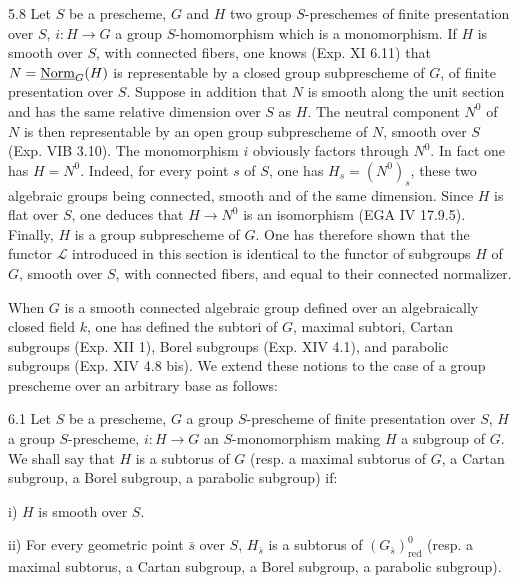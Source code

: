 \begin{remark}{5.8}\label{XV.5.8}
Let $S$ be a prescheme, $G$ and $H$ two group $S$-preschemes of finite presentation over $S$, $i:H\to G$ a group $S$-homomorphism which is a monomorphism. If $H$ is smooth over $S$, with connected fibers, one knows (Exp. XI 6.11) that $N=\underline{\mathrm{Norm}}_G(H)$ is representable by a closed group subprescheme of $G$, of finite presentation over $S$. Suppose in addition that $N$ is smooth along the unit section and has the same relative dimension over $S$ as $H$. The neutral component $N^0$ of $N$ is then representable by an open group subprescheme of $N$, smooth over $S$ (Exp. VIB 3.10). The monomorphism $i$ obviously factors through $N^0$. In fact one has $H=N^0$. Indeed, for every point $s$ of $S$, one has $H_s=(N^0)_s$, these two algebraic groups being connected, smooth and of the same dimension. Since $H$ is flat over $S$, one deduces that $H\to N^0$ is an isomorphism (EGA IV 17.9.5). Finally, $H$ is a group subprescheme of $G$. One has therefore shown that the functor $\mathscr L$ introduced in this section is identical to the functor of subgroups $H$ of $G$, smooth over $S$, with connected fibers, and equal to their connected normalizer.
\end{remark}

When $G$ is a smooth connected algebraic group defined over an algebraically closed field $k$, one has defined the subtori of $G$, maximal subtori, Cartan subgroups (Exp. XII 1), Borel subgroups (Exp. XIV 4.1), and parabolic subgroups (Exp. XIV 4.8 bis). We extend these notions to the case of a group prescheme over an arbitrary base as follows:
\begin{definition}{6.1}\label{XV.6.1}
Let $S$ be a prescheme, $G$ a group $S$-prescheme of finite presentation over $S$, $H$ a group $S$-prescheme, $i:H\to G$ an $S$-monomorphism making $H$ a subgroup of $G$. We shall say that $H$ is a subtorus of $G$ (resp. a maximal subtorus of $G$, a Cartan subgroup, a Borel subgroup, a parabolic subgroup) if:

\noindent i) $H$ is smooth over $S$.

\noindent ii) For every geometric point $\bar s$ over $S$, $H_{\bar s}$ is a subtorus of $(G_{\bar s})^0_{\mathrm{red}}$ (resp. a maximal subtorus, a Cartan subgroup, a Borel subgroup, a parabolic subgroup).
\end{definition}

